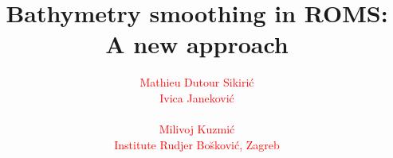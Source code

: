 \documentclass{beamer}
\begin{document}
\title{Bathymetry smoothing in ROMS: A new approach}
\author{
{\small
\begin{multicols}{2}
\textcolor{red}{\large Mathieu Dutour Sikiri\'c}\\[2mm]
\textcolor{red}{\large Ivica Janekovi\'c}\\[2mm]
\end{multicols}
\begin{center}
\textcolor{red}{\large Milivoj Kuzmi\'c}\\[2mm]
\textcolor{red}{Institute Rudjer Bo\u skovi\'c, Zagreb}
\end{center}
}
}
\date{\empty}

\frame{\titlepage} 



\end{document}
